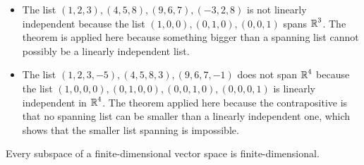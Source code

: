 \begin{example}
    \begin{itemize}
        \item 
        The list $(1, 2, 3), (4, 5, 8), (9, 6, 7), (-3, 2, 8)$ is not linearly 
        independent because the list 
        $(1, 0, 0), (0, 1, 0), (0, 0, 1)$ spans $\operatorname{\mathbb{R}}^3$. 
        The theorem is applied here because something bigger
        than a spanning list cannot possibly be a linearly independent list.
        
        \item
        The list $(1, 2, 3, -5), (4, 5, 8, 3), (9, 6, 7, -1)$ does not span $\operatorname{\mathbb{R}}^4$ because
        the list $(1, 0, 0, 0), (0, 1, 0, 0), (0, 0, 1, 0), (0, 0, 0, 1)$ is linearly independent
        in $\operatorname{\mathbb{R}}^4$. The theorem applied here because the contrapositive is that no spanning list 
        can be smaller than a linearly independent one, which shows that the smaller list spanning
        is impossible.
    \end{itemize}
\end{example}

\begin{theorem}
    Every subspace of a finite-dimensional vector space is finite-dimensional.
\end{theorem}
\endinput